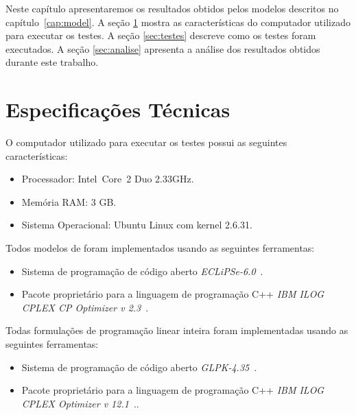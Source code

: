 Neste capítulo apresentaremos os resultados obtidos pelos modelos
descritos no capítulo~\ref{cap:model}. A seção \ref{sec:tspec} mostra
as características do computador utilizado para executar os testes. A
seção \ref{sec:testes} descreve como os testes foram executados. A
seção \ref{sec:analise} apresenta a análise dos resultados obtidos
durante este trabalho.

\section{Especificações Técnicas}
\label{sec:tspec}
O computador utilizado para executar os testes possui as seguintes
características:

\begin{itemize}
  \item{Processador: Intel\textregistered{}~Core\texttrademark~2 Duo
  2.33GHz.}

  \item{Memória RAM: 3 GB.}
  
  \item{Sistema Operacional: Ubuntu Linux com kernel 2.6.31.}
\end{itemize}

Todos modelos de \pr{} foram implementados usando as seguintes
ferramentas:

\begin{itemize}
  \item{Sistema de programação de código
  aberto \textit{ECLiPSe-6.0}~\cite{eclipse*2009}. } 
  
 \item{Pacote proprietário para a linguagem de programação
  C++ \textit{IBM\textregistered{} ILOG\textregistered{}
  CPLEX\textregistered{} CP Optimizer v 2.3}~\cite{ilogcp*2011}.}
\end{itemize}

Todas formulações de programação linear inteira foram implementadas
usando as seguintes ferramentas:

\begin{itemize}
  \item{Sistema de programação de código
  aberto \textit{GLPK-4.35}~\cite{glpk*2010}.}
  
  \item{Pacote proprietário para a linguagem de programação
  C++ \textit{IBM\textregistered{} ILOG\textregistered{}
  CPLEX\textregistered{} Optimizer v 12.1}~\cite{ilogcplex*2011}..}
\end{itemize}

